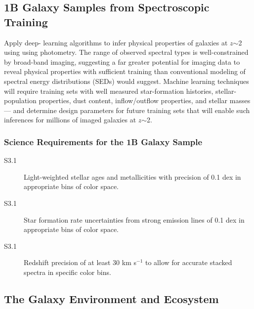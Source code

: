 \documentclass[preprint,11pt]{aastex}
\newcommand{\kms}{{\rm km s$^{-1}$}}
\begin{document}
\subsection{1B Galaxy Samples from Spectroscopic Training}
\label{sci:1Bgalaxies}

Apply deep-
learning algorithms to infer physical properties of galaxies at
$z$$\sim$2 using using photometry. The range of observed spectral
types is well-constrained by broad-band imaging,
suggesting a far greater potential for imaging data to reveal physical
properties with sufficient training than conventional modeling of
spectral energy distributions (SEDs) would suggest.  Machine
learning techniques will require training sets with well measured star-formation histories,
stellar-population properties, dust content, inflow/outflow properties,
and stellar masses --- and determine design parameters for future training sets that will enable such inferences for millions of imaged galaxies at $z$$\sim$2.

\subsubsection{Science Requirements for the 1B Galaxy Sample}

\begin{description}

\item[S3.1] Light-weighted stellar ages and metallicities with precision of 0.1 dex in appropriate bins of color space.

\item[S3.1] Star formation rate uncertainties from strong emission lines of 0.1 dex in appropriate bins of color space.

\item[S3.1] Redshift precision of at least 30 \kms{} to allow for accurate stacked spectra in specific color bins.

\end{description}


\subsection{The Galaxy Environment and Ecosystem}
\label{sci:ecosystem}
\end{document}
